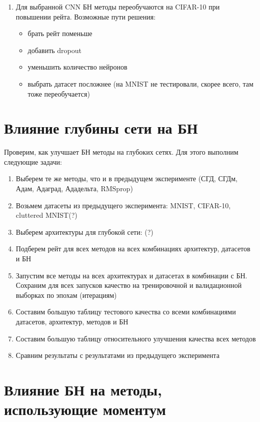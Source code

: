 \documentclass[12pt,oneside]{article}
\begin{document}
\begin{enumerate}
\item Для выбранной CNN БН методы переобучаются на CIFAR-10 при повышении рейта. Возможные пути решения: 
\begin{itemize}
\item брать рейт поменьше
\item добавить dropout
\item уменьшить количество нейронов
\item выбрать датасет посложнее (на MNIST не тестировали, скорее всего, там тоже переобучается)
\end{itemize}
\end{enumerate}

\section{Влияние глубины сети на БН}

Проверим, как улучшает БН методы на глубоких сетях. Для этого выполним следующие задачи:

\begin{enumerate}
\item Выберем те же методы, что и в предыдущем эксперименте (СГД, СГДм, Адам, Адаград, Ададельта, RMSprop)
\item Возьмем датасеты из предыдущего эксперимента: MNIST, CIFAR-10, cluttered MNIST(?)
\item Выберем архитектуры для глубокой сети: (?)
\item Подберем рейт для всех методов на всех комбинациях архитектур, датасетов и БН
\item Запустим все методы на всех архитектурах и датасетах в комбинации с БН. Сохраним для всех запусков качество на тренировочной и валидационной выборках по эпохам (итерациям)
\item Составим большую таблицу тестового качества со всеми комбинациями датасетов, архитектур, методов и БН
\item Составим большую таблицу относительного улучшения качества всех методов
\item Сравним результаты с результатами из предыдущего эксперимента
\end{enumerate}


\section{Влияние БН на методы, использующие моментум}
\end{document}
